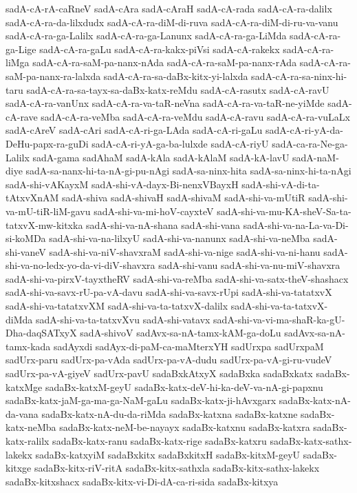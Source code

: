 {sadA-cA-rA-caRneV
sadA-cAra
sadA-cAraH
sadA-cA-rada
sadA-cA-ra-dalilx
sadA-cA-ra-da-lilxdudx
sadA-cA-ra-diM-di-ruva
sadA-cA-ra-diM-di-ru-va-vanu
sadA-cA-ra-ga-Lalilx
sadA-cA-ra-ga-Lanunx
sadA-cA-ra-ga-LiMda
sadA-cA-ra-ga-Lige
sadA-cA-ra-gaLu
sadA-cA-ra-kakx-piVsi
sadA-cA-rakekx
sadA-cA-ra-liMga
sadA-cA-ra-saM-pa-nanx-nAda
sadA-cA-ra-saM-pa-nanx-rAda
sadA-cA-ra-saM-pa-nanx-ra-lalxda
sadA-cA-ra-sa-daBx-kitx-yi-lalxda
sadA-cA-ra-sa-ninx-hi-taru
sadA-cA-ra-sa-tayx-sa-daBx-katx-reMdu
sadA-cA-rasutx
sadA-cA-ravU
sadA-cA-ra-vanUnx
sadA-cA-ra-va-taR-neVna
sadA-cA-ra-va-taR-ne-yiMde
sadA-cA-rave
sadA-cA-ra-veMba
sadA-cA-ra-veMdu
sadA-cA-ravu
sadA-cA-ra-vuLaLx
sadA-cAreV
sadA-cAri
sadA-cA-ri-ga-LAda
sadA-cA-ri-gaLu
sadA-cA-ri-yA-da-DeHu-papx-ra-guDi
sadA-cA-ri-yA-ga-ba-lulxde
sadA-cA-riyU
sadA-ca-ra-Ne-ga-Lalilx
sadA-gama
sadAhaM
sadA-kAla
sadA-kAlaM
sadA-kA-lavU
sadA-naM-diye
sadA-sa-nanx-hi-ta-nA-gi-pu-nAgi
sadA-sa-ninx-hita
sadA-sa-ninx-hi-ta-nAgi
sadA-shi-vAKayxM
sadA-shi-vA-dayx-Bi-nenxVBayxH
sadA-shi-vA-di-ta-tAtxvXnAM
sadA-shiva
sadA-shivaH
sadA-shivaM
sadA-shi-va-mUtiR
sadA-shi-va-mU-tiR-liM-gavu
sadA-shi-va-mi-hoV-cayxteV
sadA-shi-va-mu-KA-sheV-Sa-ta-tatxvX-mw-kitxka
sadA-shi-va-nA-shana
sadA-shi-vana
sadA-shi-va-na-La-va-Di-si-koMDa
sadA-shi-va-na-lilxyU
sadA-shi-va-nanunx
sadA-shi-va-neMba
sadA-shi-vaneV
sadA-shi-va-niV-shavxraM
sadA-shi-va-nige
sadA-shi-va-ni-hanu
sadA-shi-va-no-ledx-yo-da-vi-diV-shavxra
sadA-shi-vanu
sadA-shi-va-nu-miV-shavxra
sadA-shi-va-pirxV-tayxtheRV
sadA-shi-va-reMba
sadA-shi-va-satx-theV-shashacx
sadA-shi-va-savx-rU-pa-vA-davu
sadA-shi-va-savx-rUpi
sadA-shi-va-tatatxvX
sadA-shi-va-tatatxvXM
sadA-shi-va-ta-tatxvX-dalilx
sadA-shi-va-ta-tatxvX-diMda
sadA-shi-va-ta-tatxvXvu
sadA-shi-vatavx
sadA-shi-va-vi-ma-shaR-ka-gU-Dha-daqSATxyX
sadA-shivoV
sadAvx-sa-nA-tamx-kAM-ga-doLu
sadAvx-sa-nA-tamx-kada
sadAyxdi
sadAyx-di-paM-ca-maMterxYH
sadUrxpa
sadUrxpaM
sadUrx-paru
sadUrx-pa-vAda
sadUrx-pa-vA-dudu
sadUrx-pa-vA-gi-ru-vudeV
sadUrx-pa-vA-giyeV
sadUrx-pavU
sadaBxkAtxyX
sadaBxka
sadaBxkatx
sadaBx-katxMge
sadaBx-katxM-geyU
sadaBx-katx-deV-hi-ka-deV-va-nA-gi-papxnu
sadaBx-katx-jaM-ga-ma-ga-NaM-gaLu
sadaBx-katx-ji-hAvxgarx
sadaBx-katx-nA-da-vana
sadaBx-katx-nA-du-da-riMda
sadaBx-katxna
sadaBx-katxne
sadaBx-katx-neMba
sadaBx-katx-neM-be-nayayx
sadaBx-katxnu
sadaBx-katxra
sadaBx-katx-ralilx
sadaBx-katx-ranu
sadaBx-katx-rige
sadaBx-katxru
sadaBx-katx-sathx-lakekx
sadaBx-katxyiM
sadaBxkitx
sadaBxkitxH
sadaBx-kitxM-geyU
sadaBx-kitxge
sadaBx-kitx-riV-ritA
sadaBx-kitx-sathxla
sadaBx-kitx-sathx-lakekx
sadaBx-kitxshacx
sadaBx-kitx-vi-Di-dA-ca-ri-sida
sadaBx-kitxya
}
